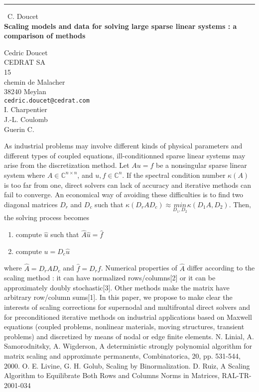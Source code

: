 \documentclass{report}
\begin{document}
\begin{center}
\rule{6in}{1pt} \
{\large C. Doucet \\
{\bf Scaling models and data for solving large sparse linear systems : a comparison of methods}}

Cedric Doucet \\ CEDRAT SA \\ 15 \\ chemin de Malacher \\ 38240 Meylan
\\
{\tt cedric.doucet@cedrat.com}\\
I. Charpentier\\
J.-L. Coulomb\\
	Guerin C.\end{center}

As industrial problems may involve different kinds of physical parameters
and different types of coupled equations, ill-conditionned sparse linear
systems may arise from the discretization method. Let $Au=f$ be a
nonsingular sparse linear system where $A\in \mathbb{C}^{n\times n}$, and
$u,f\in \mathbb{C}^n$. If the spectral condition number $\kappa(A)$ is
too far from one, direct solvers can lack of accuracy and iterative
methods can fail to converge. An economical way of avoiding these
difficulties is to find two diagonal matrices $D_r$ and $D_c$ such that
$\kappa(D_rAD_c) \approx \underset{D_1,D_2}{min}{\kappa(D_1A,D_2)}$.
Then, the solving process becomes
\begin{enumerate}
\item compute $\hat{u}$ such that $\hat{A}\hat{u}=\hat{f}$
\item compute $u = D_c\hat{u}$
\end{enumerate}
where $\hat{A}= D_rAD_c$ and $\hat{f}=D_rf$. Numerical properties of
$\hat{A}$ differ according to the scaling method : it can have normalized
rows/columns[2] or it can be approximately doubly stochastic[3]. Other
methods make the matrix have arbitrary row/column sums[1]. In this paper,
we propose to make clear the interests of scaling corrections for
supernodal and multifrontal direct solvers and for preconditioned
iterative methods on industrial applications based on Maxwell equations
(coupled problems, nonlinear materials, moving structures, transient
problems) and discretized by means of nodal or edge finite elements.
\newline
\newline
{}
\newline
[1] N. Linial, A. Samorodnitsky, A. Wigderson, A deterministic strongly
polynomial algorithm for matrix scaling and approximate permanents,
Combinatorica, 20, pp. 531-544, 2000.
\newline
[2] O. E. Livine, G. H. Golub, Scaling by Binormalization.
\newline
[3] D. Ruiz, A Scaling Algorithm to Equilibrate Both Rows and Columns
Norms in Matrices, RAL-TR-2001-034
\end{document}
